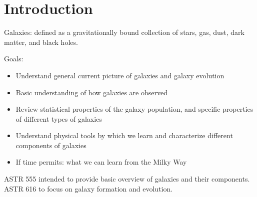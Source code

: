 \documentclass{article}
\begin{document}
\setlength{\parskip}{0pt}
\tableofcontents
\newpage
\setlength{\parskip}{10pt}
\hypersetup{colorlinks=true, urlcolor=myblue, linkcolor=pinegreen,}

\section{Introduction}
Galaxies: defined as a gravitationally bound collection of stars,
gas, dust, dark matter, and black holes.

Goals:
\begin{itemize}
    \item Understand general current picture of galaxies and galaxy evolution
    \item Basic understanding of how galaxies are observed
    \item Review statistical properties of the galaxy population, and specific properties of different types of galaxies
    \item Understand physical tools by which we learn and characterize different components of galaxies
    \item If time permits: what we can learn from the Milky Way
\end{itemize}

ASTR 555 intended to provide basic overview of galaxies and their components.
ASTR 616 to focus on galaxy formation and evolution.
\end{document}
